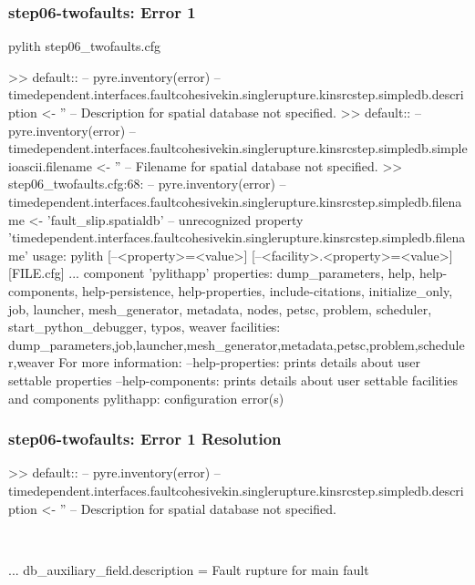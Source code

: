 \documentclass[aspectratio=169]{beamer}
\begin{document}
\begin{frame}[fragile]
  \frametitle{{\ttfamily step06-twofaults}: Error 1}

\begin{bashcode}
pylith step06_twofaults.cfg

 >> {default}::
 -- pyre.inventory(error)
 -- timedependent.interfaces.faultcohesivekin.singlerupture.kinsrcstep.simpledb.description <- ''
 -- Description for spatial database not specified.
 >> {default}::
 -- pyre.inventory(error)
 -- timedependent.interfaces.faultcohesivekin.singlerupture.kinsrcstep.simpledb.simpleioascii.filename <- ''
 -- Filename for spatial database not specified.
 >> step06_twofaults.cfg:68:
 -- pyre.inventory(error)
 -- timedependent.interfaces.faultcohesivekin.singlerupture.kinsrcstep.simpledb.filename <- 'fault_slip.spatialdb'
 -- unrecognized property 'timedependent.interfaces.faultcohesivekin.singlerupture.kinsrcstep.simpledb.filename'
usage: pylith [--<property>=<value>] [--<facility>.<property>=<value>] [FILE.cfg] ...
component 'pylithapp'
    properties: dump_parameters, help, help-components, help-persistence, help-properties, include-citations, initialize_only, job, launcher, mesh_generator, metadata, nodes, petsc, problem, scheduler, start_python_debugger, typos, weaver
    facilities: dump_parameters,job,launcher,mesh_generator,metadata,petsc,problem,scheduler,weaver
For more information:
  --help-properties: prints details about user settable properties
  --help-components: prints details about user settable facilities and components
pylithapp: configuration error(s)
\end{bashcode}

\end{frame}


\begin{frame}[t,fragile]
  \frametitle{{\ttfamily step06-twofaults}: Error 1 Resolution}

  \tserror
  \begin{bashcode}
    >> {default}::
    -- pyre.inventory(error)
    -- timedependent.interfaces.faultcohesivekin.singlerupture.kinsrcstep.simpledb.description <- ''
    -- Description for spatial database not specified.
  \end{bashcode}

  \pause\\[1pt]

  \begin{cfgcode}
    ...
    db_auxiliary_field.description = Fault rupture for main fault
  \end{cfgcode}

\end{frame}
\end{document}

